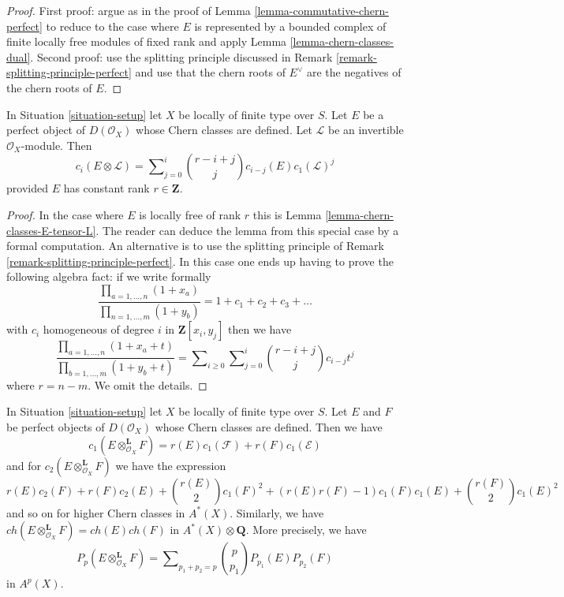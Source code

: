 \begin{proof}
First proof: argue as in the proof of
Lemma \ref{lemma-commutative-chern-perfect}
to reduce to the case where $E$ is represented
by a bounded complex of finite locally free modules
of fixed rank and apply Lemma \ref{lemma-chern-classes-dual}.
Second proof: use the splitting principle discussed
in Remark \ref{remark-splitting-principle-perfect}
and use that the chern roots of $E^\vee$ are the negatives
of the chern roots of $E$.
\end{proof}

\begin{lemma}
\label{lemma-chern-class-perfect-tensor-invertible}
In Situation \ref{situation-setup} let $X$ be locally of finite type over $S$.
Let $E$ be a perfect object of $D(\mathcal{O}_X)$ whose Chern classes
are defined.
Let $\mathcal{L}$ be an invertible $\mathcal{O}_X$-module. Then
$$
c_i(E \otimes \mathcal{L}) =
\sum\nolimits_{j = 0}^i
\binom{r - i + j}{j} c_{i - j}(E) c_1(\mathcal{L})^j
$$
provided $E$ has constant rank $r \in \mathbf{Z}$.
\end{lemma}

\begin{proof}
In the case where $E$ is locally free of rank $r$ this is
Lemma \ref{lemma-chern-classes-E-tensor-L}. The reader can deduce
the lemma from this special case by a formal computation.
An alternative is to use the splitting principle of
Remark \ref{remark-splitting-principle-perfect}.
In this case one ends up having to prove the following
algebra fact: if we write formally
$$
\frac{\prod_{a = 1, \ldots, n} (1 + x_a)}{\prod_{n = 1, \ldots, m} (1 + y_b)}
= 1 + c_1 + c_2 + c_3 + \ldots
$$
with $c_i$ homogeneous of degree $i$
in $\mathbf{Z}[x_i, y_j]$ then we have
$$
\frac{\prod_{a = 1, \ldots, n} (1 + x_a + t)}{\prod_{b = 1, \ldots, m} (1 + y_b + t)}
= \sum\nolimits_{i \geq 0} \sum\nolimits_{j = 0}^i
\binom{r - i + j}{j} c_{i - j} t^j
$$
where $r = n - m$. We omit the details.
\end{proof}

\begin{lemma}
\label{lemma-chern-classes-perfect-tensor-product}
In Situation \ref{situation-setup} let $X$ be locally of finite type over $S$.
Let $E$ and $F$ be perfect objects of $D(\mathcal{O}_X)$ whose Chern classes
are defined. Then we have
$$
c_1(E \otimes_{\mathcal{O}_X}^\mathbf{L} F) =
r(E) c_1(\mathcal{F}) + r(F) c_1(\mathcal{E})
$$
and for $c_2(E \otimes_{\mathcal{O}_X}^\mathbf{L} F)$ we have the expression
$$
r(E) c_2(F) + r(F) c_2(E) + {r(E) \choose 2} c_1(F)^2 +
(r(E)r(F) - 1) c_1(F)c_1(E) + {r(F) \choose 2} c_1(E)^2
$$
and so on for higher Chern classes in $A^*(X)$. Similarly, we have
$ch(E \otimes_{\mathcal{O}_X}^\mathbf{L} F) = ch(E) ch(F)$
in $A^*(X) \otimes \mathbf{Q}$. More precisely, we have
$$
P_p(E \otimes_{\mathcal{O}_X}^\mathbf{L} F) = \sum\nolimits_{p_1 + p_2 = p}
{p \choose p_1} P_{p_1}(E) P_{p_2}(F)
$$
in $A^p(X)$.
\end{lemma}

